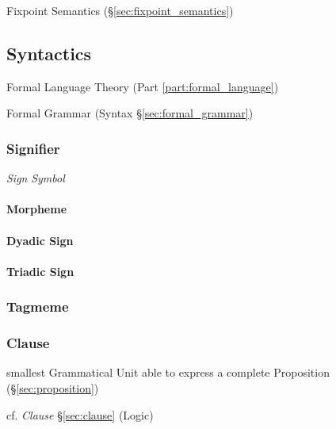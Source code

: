 Fixpoint Semantics (\S\ref{sec:fixpoint_semantics})



\subsection{Syntactics}\label{sec:syntactics}

Formal Language Theory (Part \ref{part:formal_language})

Formal Grammar (Syntax \S\ref{sec:formal_grammar})



\subsubsection{Signifier}\label{sec:signifier}

\emph{Sign} \emph{Symbol}



\paragraph{Morpheme}\label{sec:morpheme}\hfill

\paragraph{Dyadic Sign}\label{sec:dyadic_sign}\hfill

\paragraph{Triadic Sign}\label{sec:triadic_sign}\hfill



\subsubsection{Tagmeme}\label{sec:tagmeme}

\subsubsection{Clause}\label{sec:grammatical_clause}

smallest Grammatical Unit able to express a complete Proposition
(\S\ref{sec:proposition})

cf. \emph{Clause} \S\ref{sec:clause} (Logic)



